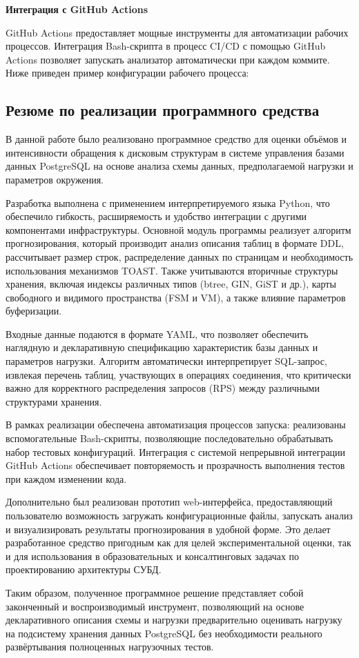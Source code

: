 \textbf{Интеграция с GitHub Actions}

GitHub Actions предоставляет мощные инструменты для автоматизации рабочих процессов. Интеграция Bash-скрипта в процесс CI/CD с помощью GitHub Actions позволяет запускать анализатор автоматически при каждом коммите. Ниже приведен пример конфигурации рабочего процесса:


\subsection{Резюме по реализации программного средства}

В данной работе было реализовано программное средство для оценки объёмов и интенсивности обращения к дисковым структурам в системе управления базами данных PostgreSQL на основе анализа схемы данных, предполагаемой нагрузки и параметров окружения.

Разработка выполнена с применением интерпретируемого языка Python, что обеспечило гибкость, расширяемость и удобство интеграции с другими компонентами инфраструктуры. Основной модуль программы реализует алгоритм прогнозирования, который производит анализ описания таблиц в формате DDL, рассчитывает размер строк, распределение данных по страницам и необходимость использования механизмов TOAST. Также учитываются вторичные структуры хранения, включая индексы различных типов (btree, GIN, GiST и др.), карты свободного и видимого пространства (FSM и VM), а также влияние параметров буферизации.

Входные данные подаются в формате YAML, что позволяет обеспечить наглядную и декларативную спецификацию характеристик базы данных и параметров нагрузки. Алгоритм автоматически интерпретирует SQL-запрос, извлекая перечень таблиц, участвующих в операциях соединения, что критически важно для корректного распределения запросов (RPS) между различными структурами хранения.

В рамках реализации обеспечена автоматизация процессов запуска: реализованы вспомогательные Bash-скрипты, позволяющие последовательно обрабатывать набор тестовых конфигураций. Интеграция с системой непрерывной интеграции GitHub Actions обеспечивает повторяемость и прозрачность выполнения тестов при каждом изменении кода.

Дополнительно был реализован прототип web-интерфейса, предоставляющий пользователю возможность загружать конфигурационные файлы, запускать анализ и визуализировать результаты прогнозирования в удобной форме. Это делает разработанное средство пригодным как для целей экспериментальной оценки, так и для использования в образовательных и консалтинговых задачах по проектированию архитектуры СУБД.

Таким образом, полученное программное решение представляет собой законченный и воспроизводимый инструмент, позволяющий на основе декларативного описания схемы и нагрузки предварительно оценивать нагрузку на подсистему хранения данных PostgreSQL без необходимости реального развёртывания полноценных нагрузочных тестов.

